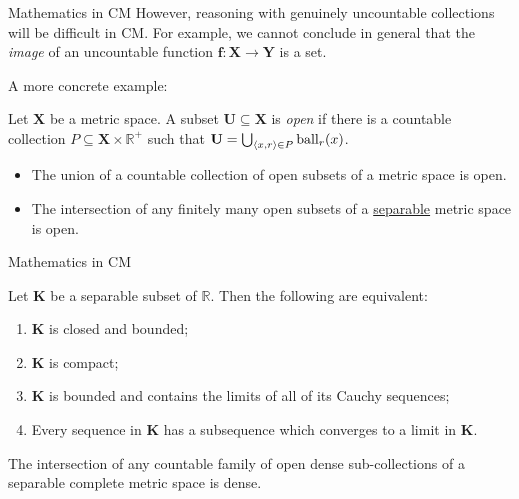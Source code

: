 \documentclass{beamer}
\newcommand{\tuple}[1]{\left\langle #1 \right\rangle}
\begin{document}
\begin{frame}{Mathematics in $\mathrm{CM}$}
  However, reasoning with genuinely uncountable collections will be difficult in $\mathrm{CM}$. For example, we cannot conclude in general that the \emph{image} of an uncountable function $\mathbf{f} : \mathbf{X} \rightarrow \mathbf{Y}$ is a set.

  \pause

  \vspace{0.6em}

  A more concrete example:

  \begin{definition}
    Let $\mathbf{X}$ be a metric space. A subset $\mathbf{U} \subseteq \mathbf{X}$ is \emph{open} if there is a countable collection $P \subseteq \mathbf{X} \times \mathbb{R}^+$ such that $\mathbf{U} = \bigcup_{\tuple{x, r} \in P} \mathrm{ball}_r\mleft(x\mright)$.
  \end{definition}

  \begin{theorem}
    \begin{itemize}
      \item The union of a countable collection of open
            subsets of a metric space is open.
      \item The intersection of any finitely many open subsets of a \underline{separable} metric space is open.
    \end{itemize}
  \end{theorem}
\end{frame}

\begin{frame}{Mathematics in $\mathrm{CM}$}
  \begin{theorem}
    Let $\mathbf{K}$ be a separable subset of $\mathbb{R}$. Then the following are equivalent:
    \begin{enumerate}
      \item $\mathbf{K}$ is closed and bounded;
      \item $\mathbf{K}$ is compact;
      \item $\mathbf{K}$ is bounded and contains the limits of all of its Cauchy sequences;
      \item Every sequence in $\mathbf{K}$ has a subsequence which converges to a limit in $\mathbf{K}$.
    \end{enumerate}
  \end{theorem}

  \vspace{1em}

  \begin{theorem}
    The intersection of any countable family of open dense sub-collections of a separable complete metric space is dense.
  \end{theorem}
\end{frame}
\end{document}
